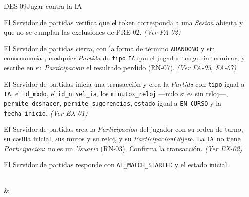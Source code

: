 \begin{fichacu}{DES-09}{Jugar contra la IA}
{\begin{cuenum}[start=1]
      \item El Servidor de partidas verifica que el token corresponda a una \textit{Sesion} abierta y que no se cumplan las exclusiones de \mbox{PRE-02}. \textit{(Ver \mbox{FA-02})}
      \item El Servidor de partidas cierra, con la forma de término \texttt{ABANDONO} y sin consecuencias, cualquier \textit{Partida} de \texttt{tipo} \texttt{IA} que el jugador tenga sin terminar, y escribe en su \textit{Participacion} el resultado perdido (\mbox{RN-07}). \textit{(Ver \mbox{FA-03}, \mbox{FA-07})}
      \item El Servidor de partidas inicia una transacción y crea la \textit{Partida} con \texttt{tipo} igual a \texttt{IA}, el \texttt{id\_\allowbreak{}modo}, el \texttt{id\_\allowbreak{}nivel\_\allowbreak{}ia}, los \texttt{minutos\_\allowbreak{}reloj} —nulo si es sin reloj—, \texttt{permite\_\allowbreak{}deshacer}, \texttt{permite\_\allowbreak{}sugerencias}, \texttt{estado} igual a \texttt{EN\_\allowbreak{}CURSO} y la \texttt{fecha\_\allowbreak{}inicio}. \textit{(Ver \mbox{EX-01})}
      \item El Servidor de partidas crea la \textit{Participacion} del jugador con su orden de turno, su casilla inicial, sus muros y su reloj, y su \textit{ParticipacionObjeto}. La IA no tiene \textit{Participacion}: no es un \textit{Usuario} (\mbox{RN-03}). Confirma la transacción. \textit{(Ver \mbox{EX-02})}
      \item El Servidor de partidas responde con \texttt{AI\_\allowbreak{}MATCH\_\allowbreak{}STARTED} y el estado inicial.
    \end{cuenum}} \\
   & 
\end{fichacu}
